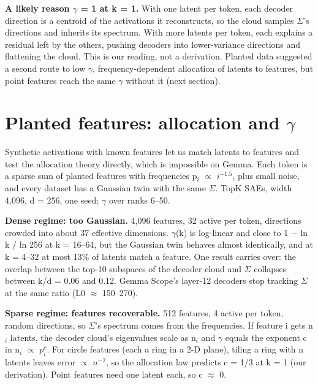 \documentclass[11pt]{article}
\begin{document}
\textbf{A likely reason $\gamma$ = 1 at k = 1.} With one latent per token, each decoder direction is a centroid of the activations it reconstructs, so the cloud samples $\Sigma$'s directions and inherits its spectrum. With more latents per token, each explains a residual left by the others, pushing decoders into lower-variance directions and flattening the cloud. This is our reading, not a derivation. Planted data suggested a second route to low $\gamma$, frequency-dependent allocation of latents to features, but point features reach the same $\gamma$ without it (next section).

\section{Planted features: allocation and $\gamma$}

Synthetic activations with known features let us match latents to features and test the allocation theory directly, which is impossible on Gemma. Each token is a sparse sum of planted features with frequencies p$_i$ $\propto$ $i^{-1.5}$, plus small noise, and every dataset has a Gaussian twin with the same $\Sigma$. TopK SAEs, width 4,096, d = 256, one seed; $\gamma$ over ranks 6--50.

\textbf{Dense regime: too Gaussian.} 4,096 features, 32 active per token, directions crowded into about 37 effective dimensions. $\gamma$(k) is log-linear and close to 1 $-$ ln k / ln 256 at k = 16--64, but the Gaussian twin behaves almost identically, and at k = 4--32 at most 13\% of latents match a feature. One result carries over: the overlap between the top-10 subspaces of the decoder cloud and $\Sigma$ collapses between k/d = 0.06 and 0.12. Gemma Scope's layer-12 decoders stop tracking $\Sigma$ at the same ratio (L0 $\approx$ 150--270).

\textbf{Sparse regime: features recoverable.} 512 features, 4 active per token, random directions, so $\Sigma$'s spectrum comes from the frequencies. If feature i gets n$_i$ latents, the decoder cloud's eigenvalues scale as n$_i$ and $\gamma$ equals the exponent c in n$_i$ $\propto$ $p_i^{c}$. For circle features (each a ring in a 2-D plane), tiling a ring with n latents leaves error $\propto$ $n^{-2}$, so the allocation law predicts c = 1/3 at k = 1 (our derivation). Point features need one latent each, so c $\approx$ 0.
\end{document}
